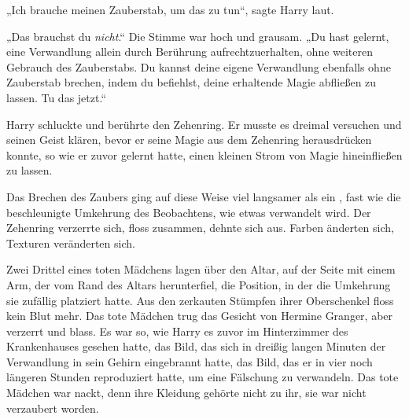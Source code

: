 „Ich brauche meinen Zauberstab, um das zu tun“, sagte Harry laut.

„Das brauchst du \emph{nicht}.“ Die Stimme war hoch und grausam.
„Du hast gelernt, eine Verwandlung allein durch Berührung aufrechtzuerhalten, ohne weiteren Gebrauch des Zauberstabs. Du kannst deine eigene Verwandlung ebenfalls ohne Zauberstab brechen, indem du befiehlst, deine erhaltende Magie abfließen zu lassen. Tu das jetzt.“

Harry schluckte und berührte den Zehenring. Er musste es dreimal versuchen und seinen Geist klären, bevor er seine Magie aus dem Zehenring herausdrücken konnte, so wie er zuvor gelernt hatte, einen kleinen Strom von Magie hineinfließen zu lassen.

Das Brechen des Zaubers ging auf diese Weise viel langsamer als ein , fast wie die beschleunigte Umkehrung des Beobachtens, wie etwas verwandelt wird. Der Zehenring verzerrte sich, floss zusammen, dehnte sich aus. Farben änderten sich, Texturen veränderten sich.

Zwei Drittel eines toten Mädchens lagen über den Altar, auf der Seite mit einem Arm, der vom Rand des Altars herunterfiel, die Position, in der die Umkehrung sie zufällig platziert hatte. Aus den zerkauten Stümpfen ihrer Oberschenkel floss kein Blut mehr. Das tote Mädchen trug das Gesicht von Hermine Granger, aber verzerrt und blass. Es war so, wie Harry es zuvor im Hinterzimmer des Krankenhauses gesehen hatte, das Bild, das sich in dreißig langen Minuten der Verwandlung in sein Gehirn eingebrannt hatte, das Bild, das er in vier noch längeren Stunden reproduziert hatte, um eine Fälschung zu verwandeln. Das tote Mädchen war nackt, denn ihre Kleidung gehörte nicht zu ihr, sie war nicht verzaubert worden.

